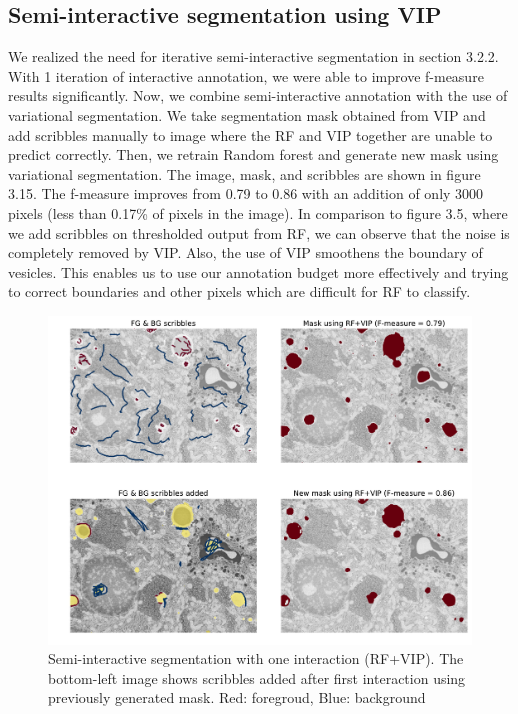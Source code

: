 \subsection{Semi-interactive segmentation using VIP}
We realized the need for iterative semi-interactive segmentation in section 3.2.2. With 1 iteration of interactive annotation, we were able to improve f-measure results significantly. Now, we combine semi-interactive annotation with the use of variational segmentation. We take segmentation mask obtained from VIP and add scribbles manually to image where the RF and VIP together are unable to predict correctly. Then, we retrain Random forest and generate new mask using variational segmentation. The image, mask, and scribbles are shown in figure 3.15. The f-measure improves from 0.79 to 0.86 with an addition of only 3000 pixels (less than 0.17\% of pixels in the image). In comparison to figure 3.5, where we add scribbles on thresholded output from RF, we can observe that the noise is completely removed by VIP. Also, the use of VIP smoothens the boundary of vesicles. This enables us to use our annotation budget more effectively and trying to correct boundaries and other pixels which are difficult for RF to classify.
\begin{figure}[h!] \label{fig:semi-vip}
 \includegraphics[width=1.0\linewidth]{figures/semi_inter_vip.pdf}
\caption{Semi-interactive segmentation with one interaction (RF+VIP). The bottom-left image shows scribbles added after first interaction using previously generated mask. Red: foregroud, Blue: background}
\end{figure}
